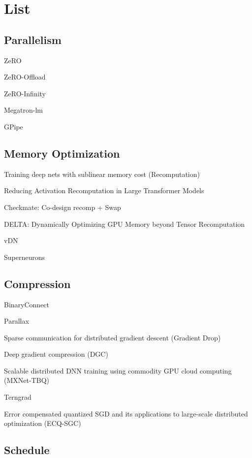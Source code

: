 \section{List}
\subsection{Parallelism}


ZeRO~\cite{zero}

ZeRO-Offload~\cite{zero-offload}

ZeRO-Infinity~\cite{zero-infinity}\

Megatron-lm~\cite{megatron-lm}

GPipe~\cite{gpipe}


\subsection{Memory Optimization}

Training deep nets with sublinear memory cost (Recomputation) ~\cite{chen2016training}

Reducing Activation Recomputation in Large Transformer Models~\cite{megatron3}

Checkmate: Co-design recomp + Swap ~\cite{checkmate}

DELTA: Dynamically Optimizing GPU Memory beyond Tensor Recomputation ~\cite{tang2022delta}

vDN ~\cite{rhu2016vdnn}

Superneurons ~\cite{wang2018superneurons}

\subsection{Compression}
BinaryConnect ~\cite{courbariaux2015binaryconnect}

Parallax ~\cite{kim2019parallax}

Sparse communication for distributed gradient descent (Gradient Drop) ~\cite{aji2017sparse}

Deep gradient compression (DGC) ~\cite{lin2017deep}

Scalable distributed DNN training using commodity GPU cloud computing (MXNet-TBQ) ~\cite{strom2015scalable}

Terngrad ~\cite{wen2017terngrad}

Error compensated quantized SGD and its applications to large-scale distributed optimization (ECQ-SGC) ~\cite{wu2018error}


\subsection{Schedule}

